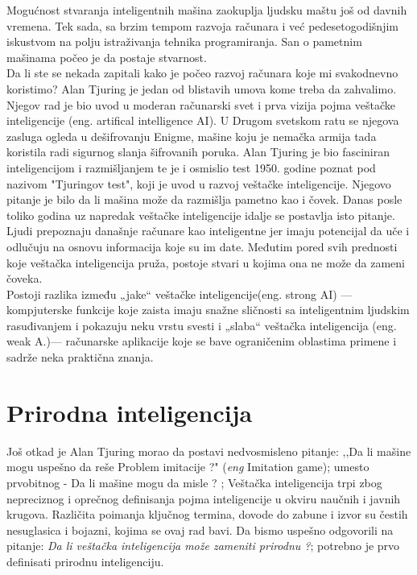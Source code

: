 \documentclass[a4paper]{article}
\begin{document}
Mogućnost stvaranja inteligentnih mašina zaokuplja ljudsku maštu još od davnih vremena. Tek sada, sa brzim tempom razvoja računara i već pedesetogodišnjim iskustvom na polju istraživanja tehnika programiranja. San o pametnim mašinama počeo je da postaje stvarnost.\\
Da li ste se nekada zapitali kako je počeo razvoj računara koje mi svakodnevno koristimo? Alan Tjuring je jedan od blistavih umova kome treba da zahvalimo.  Njegov rad je bio uvod u moderan računarski svet i prva vizija pojma veštačke inteligencije (eng. artifical intelligence AI). U Drugom svetskom ratu se njegova zasluga ogleda u dešifrovanju Enigme, mašine koju je nemačka armija tada koristila radi sigurnog slanja šifrovanih poruka. Alan Tjuring je bio fasciniran inteligencijom i razmišljanjem te je i osmislio test 1950. godine poznat pod nazivom "Tjuringov test", koji je uvod u razvoj veštačke inteligencije. Njegovo pitanje je bilo da li mašina može da razmišlja pametno kao i čovek. Danas posle toliko godina uz napredak veštačke inteligencije idalje se postavlja isto pitanje. Ljudi prepoznaju današnje računare kao inteligentne jer imaju potencijal da uče i odlučuju na osnovu informacija koje su im date. Međutim pored svih prednosti koje veštačka inteligencija pruža, postoje stvari u kojima ona ne može da zameni čoveka.\\ 
Postoji razlika između „jake“ veštačke inteligencije(eng. strong AI) — kompjuterske funkcije koje zaista imaju snažne sličnosti sa inteligentnim ljudskim rasuđivanjem i pokazuju neku vrstu  svesti  i „slaba“ veštačka inteligencija (eng. weak A.)— računarske aplikacije koje se bave ograničenim oblastima primene i sadrže neka praktična znanja. 


\section{Prirodna inteligencija}
\label{poglavlje:prirodnaInt}
Još otkad je Alan Tjuring morao da postavi nedvosmisleno pitanje: ,,Da li mašine mogu uspešno da reše Problem imitacije ?" (\emph{eng} Imitation game); umesto prvobitnog - Da li mašine mogu da misle ? \cite{turing2009computing}; Veštačka inteligencija trpi zbog nepreciznog i oprečnog definisanja pojma inteligencije u okviru naučnih i javnih krugova. Različita poimanja ključnog termina, dovode do zabune i izvor su čestih nesuglasica i bojazni, kojima se ovaj rad bavi. Da bismo uspešno odgovorili na pitanje: \textit{Da li veštačka inteligencija može zameniti prirodnu ?}; potrebno je prvo definisati prirodnu inteligenciju.
\end{document}
